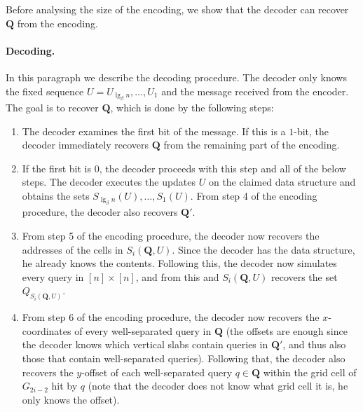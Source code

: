 \documentclass[letterpaper]{article}
\newcommand{\Q}{\textbf{Q}}
\begin{document}
Before analysing the size of the encoding, we show that the decoder
can recover $\Q$ from the encoding.

\paragraph{Decoding.} 
In this paragraph we describe the decoding procedure. The decoder only
knows the fixed sequence $U=U_{\lg_\beta n},\dots,U_1$ and the message
received from the encoder. The goal is to recover $\Q$, which is done
by the following steps:
\begin{enumerate}
\item The decoder examines the first bit of the message. If this is a
  $1$-bit, the decoder immediately recovers $\Q$ from the remaining
  part of the encoding.

\item If the first bit is $0$, the decoder proceeds with this step and
  all of the below steps. The decoder executes the updates $U$ on the
  claimed data structure and obtains the sets $S_{\lg_\beta
    n}(U),\dots,S_1(U)$. From step 4 of the encoding procedure, the
  decoder also recovers $\Q'$.

\item From step 5 of the encoding procedure, the decoder now recovers
  the addresses of the cells in $S_i(\Q,U)$. Since the decoder has the
  data structure, he already knows the contents. Following this, the
  decoder now simulates every query in $[n] \times [n]$, and from this
  and $S_i(\Q,U)$ recovers the set $Q_{S_i(\Q,U)}$.

\item From step 6 of the encoding procedure, the decoder now recovers
  the $x$-coordinates of every well-separated query in $\Q$ (the
  offsets are enough since the decoder knows which vertical slabs
  contain queries in $\Q'$, and thus also those that contain
  well-separated queries). Following that, the decoder also recovers
  the $y$-offset of each well-separated query $q \in \Q$ within the
  grid cell of $G_{2i-2}$ hit by $q$ (note that the decoder does not
  know what grid cell it is, he only knows the offset).


\end{enumerate}
\end{document}
